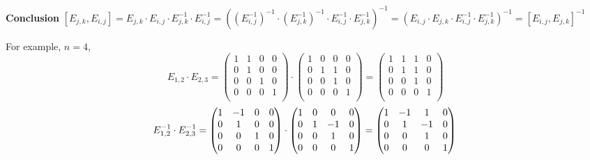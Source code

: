 \documentclass[12pt]{article}
\begin{document}
\textbf{Conclusion} \newline
\( [E_{j,k},E_{i,j}]=E_{j,k} \cdot E_{i,j} \cdot E_{j,k}^{-1} \cdot E_{i,j}^{-1}=
((E_{i,j}^{-1})^{-1} \cdot (E_{j,k}^{-1})^{-1} \cdot E_{i,j}^{-1} \cdot E_{j,k}^{-1})^{-1}= 
(E_{i,j} \cdot E_{j,k} \cdot E_{i,j}^{-1} \cdot E_{j,k}^{-1})^{-1}=[E_{i,j},E_{j,k}]^{-1}  \) \newline

For example, \( n=4 \), \newline
$$ E_{1,2} \cdot E_{2,3}=\begin{pmatrix} 
	1 & 1 & 0 & 0 \\
	0 & 1 & 0 & 0 \\
	0 & 0 & 1 & 0 \\
	0 & 0 & 0 & 1 \\
	\end{pmatrix} \cdot \begin{pmatrix} 
	1 & 0 & 0 & 0 \\
	0 & 1 & 1 & 0 \\
	0 & 0 & 1 & 0 \\
	0 & 0 & 0 & 1 \\
	\end{pmatrix}=\begin{pmatrix} 
	1 & 1 & 1 & 0 \\
	0 & 1 & 1 & 0 \\
	0 & 0 & 1 & 0 \\
	0 & 0 & 0 & 1 \\
	\end{pmatrix} $$
$$  E_{1,2}^{-1} \cdot E_{2,3}^{-1}=\begin{pmatrix} 
	1 & -1 & 0 & 0 \\
	0 & 1 & 0 & 0 \\
	0 & 0 & 1 & 0 \\
	0 & 0 & 0 & 1 \\
	\end{pmatrix} \cdot \begin{pmatrix} 
	1 & 0 & 0 & 0 \\
	0 & 1 & -1 & 0 \\
	0 & 0 & 1 & 0 \\
	0 & 0 & 0 & 1 \\
	\end{pmatrix}=\begin{pmatrix} 
	1 & -1 & 1 & 0 \\
	0 & 1 & -1 & 0 \\
	0 & 0 & 1 & 0 \\
	0 & 0 & 0 & 1 \\
	\end{pmatrix} \newline
$$
\end{document}

